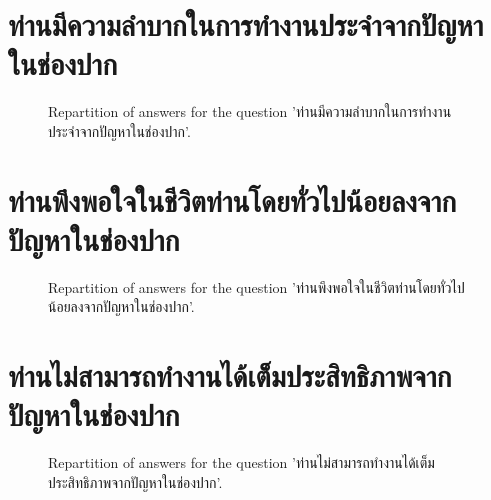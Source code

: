 \documentclass[12pt]{article}
\begin{document}
\clearpage{}
\section{ท่านมีความลำบากในการทำงานประจำจากปัญหาในช่องปาก}

\label{sec:141}


\begin{figure}[h!]
    \caption{\label{figure:q141-1}Repartition of answers for the question 'ท่านมีความลำบากในการทำงานประจำจากปัญหาในช่องปาก'.}
\end{figure}



\clearpage{}
\section{ท่านพึงพอใจในชีวิตท่านโดยทั่วไปน้อยลงจากปัญหาในช่องปาก}

\label{sec:142}


\begin{figure}[h!]
    \caption{\label{figure:q142-1}Repartition of answers for the question 'ท่านพึงพอใจในชีวิตท่านโดยทั่วไปน้อยลงจากปัญหาในช่องปาก'.}
\end{figure}



\clearpage{}
\section{ท่านไม่สามารถทำงานได้เต็มประสิทธิภาพจากปัญหาในช่องปาก}

\label{sec:143}


\begin{figure}[h!]
    \caption{\label{figure:q143-1}Repartition of answers for the question 'ท่านไม่สามารถทำงานได้เต็มประสิทธิภาพจากปัญหาในช่องปาก'.}
\end{figure}
\end{document}
